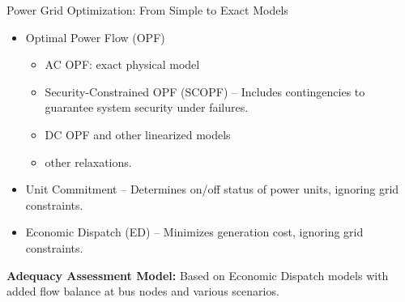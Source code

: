 \documentclass[11pt, aspectratio=169]{beamer}
\begin{document}
\begin{frame}{Power Grid Optimization: From Simple to Exact Models}
    \begin{itemize}
      \item Optimal Power Flow (OPF) \hfill \textcolor{gray}{\cite{MathProgForm}}
        \begin{itemize}
          \item AC OPF: exact physical model 
          \item Security-Constrained OPF (SCOPF) -- Includes contingencies to guarantee system security under failures.
          \item DC OPF and other linearized models \hfill \textcolor{gray}{\cite{LinRelBien} }
          \item other relaxations. 
        \end{itemize}
       
      \item Unit Commitment -- Determines on/off status of power units, ignoring grid constraints.
      \item Economic Dispatch (ED) -- Minimizes generation cost, ignoring grid constraints.  
    \end{itemize}
  
    \vfill
    \textbf{Adequacy Assessment Model:} Based on Economic Dispatch models with added flow balance at bus nodes and various scenarios.
\end{frame}
\end{document}
